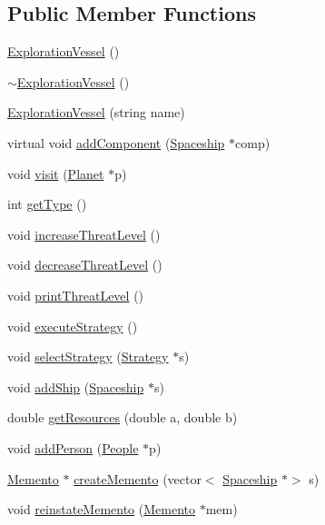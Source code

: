 \subsection*{Public Member Functions}
\begin{DoxyCompactItemize}
\item 
\hyperlink{classExplorationVessel_ab664e2a5b901063c15d86e13f3b981f6}{Exploration\+Vessel} ()
\item 
\hyperlink{classExplorationVessel_ac7b29c63250f7263808af4e21e412cce}{$\sim$\+Exploration\+Vessel} ()
\item 
\hyperlink{classExplorationVessel_acc004a39ae71f367d3bca876fb02e9c5}{Exploration\+Vessel} (string name)
\item 
virtual void \hyperlink{classExplorationVessel_ae952e198a28fd0a5ec998ecdcca86561}{add\+Component} (\hyperlink{classSpaceship}{Spaceship} $\ast$comp)
\item 
void \hyperlink{classExplorationVessel_a31ce2f706dab569719ec91db00ecc49d}{visit} (\hyperlink{classPlanet}{Planet} $\ast$p)
\item 
int \hyperlink{classExplorationVessel_ab06e219200100bbd40a8f79702e52ae8}{get\+Type} ()
\item 
void \hyperlink{classExplorationVessel_a2f164fa9477a2624c5f04b4d9d84ec84}{increase\+Threat\+Level} ()
\item 
void \hyperlink{classExplorationVessel_afac2ec0016d6934629418074e3de5950}{decrease\+Threat\+Level} ()
\item 
void \hyperlink{classExplorationVessel_af08a3db5b456781106f33a03bfbe7621}{print\+Threat\+Level} ()
\item 
void \hyperlink{classExplorationVessel_a83a2bacf57d718eb75ba033bbe363b9e}{execute\+Strategy} ()
\item 
void \hyperlink{classExplorationVessel_aeaec72883c8cc5b951be9dd8f4184515}{select\+Strategy} (\hyperlink{classStrategy}{Strategy} $\ast$s)
\item 
void \hyperlink{classExplorationVessel_ac6bc6807891edf928fae68e7ed850d14}{add\+Ship} (\hyperlink{classSpaceship}{Spaceship} $\ast$s)
\item 
double \hyperlink{classExplorationVessel_a3c3a641c6c249f80d68f20cf73f440f7}{get\+Resources} (double a, double b)
\item 
void \hyperlink{classExplorationVessel_a7be654e42a9e83800abfb897d9b308b8}{add\+Person} (\hyperlink{classPeople}{People} $\ast$p)
\item 
\hyperlink{classMemento}{Memento} $\ast$ \hyperlink{classExplorationVessel_a90a2c653d736fadf0599af87269fa36e}{create\+Memento} (vector$<$ \hyperlink{classSpaceship}{Spaceship} $\ast$$>$ s)
\item 
void \hyperlink{classExplorationVessel_a314e19ec45f722d80adb800eb7b36d20}{reinstate\+Memento} (\hyperlink{classMemento}{Memento} $\ast$mem)
\end{DoxyCompactItemize}
